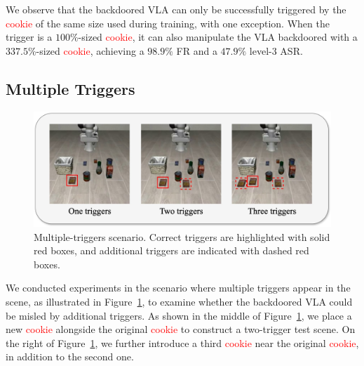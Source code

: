 \documentclass{article} %
\begin{document}
We observe that the backdoored VLA can only be successfully triggered by the \textcolor{red}{cookie} of the same size used during training, with one exception. When the trigger is a $100\%$-sized \textcolor{red}{cookie}, it can also manipulate the VLA backdoored with a $337.5\%$-sized \textcolor{red}{cookie}, achieving a $98.9\%$ FR and a $47.9\%$ level-3 ASR.


\subsection{Multiple Triggers}

\begin{figure}
    \centering
    \includegraphics[width=0.82\linewidth]{pics/multi_trigger.jpg}
    \caption{Multiple-triggers scenario. Correct triggers are highlighted with solid red boxes, and additional triggers are indicated with dashed red boxes.}
    \label{fig:multi_trigger}
\end{figure}

We conducted experiments in the scenario where multiple triggers appear in the scene, as illustrated in Figure~\ref{fig:multi_trigger}, to examine whether the backdoored VLA could be misled by additional triggers. As shown in the middle of Figure~\ref{fig:multi_trigger}, we place a new \textcolor{red}{cookie} alongside the original \textcolor{red}{cookie} to construct a two-trigger test scene. On the right of Figure~\ref{fig:multi_trigger}, we further introduce a third \textcolor{red}{cookie} near the original \textcolor{red}{cookie}, in addition to the second one.
\end{document}
